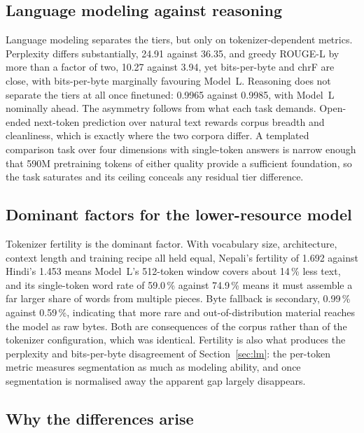 \documentclass[10pt,a4paper]{article}
\newcommand{\pc}[1]{#1\,\%}
\begin{document}
\subsection{Language modeling against reasoning}

Language modeling separates the tiers, but only on tokenizer-dependent
metrics. Perplexity differs substantially, 24.91 against 36.35, and greedy
ROUGE-L by more than a factor of two, 10.27 against 3.94, yet bits-per-byte and
chrF are close, with bits-per-byte marginally favouring Model~L. Reasoning does
not separate the tiers at all once finetuned: 0.9965 against 0.9985, with
Model~L nominally ahead. The asymmetry follows from what each task demands.
Open-ended next-token prediction over natural text rewards corpus breadth and
cleanliness, which is exactly where the two corpora differ. A templated
comparison task over four dimensions with single-token answers is narrow enough
that 590M pretraining tokens of either quality provide a sufficient foundation,
so the task saturates and its ceiling conceals any residual tier difference.

\subsection{Dominant factors for the lower-resource model}

Tokenizer fertility is the dominant factor. With vocabulary size,
architecture, context length and training recipe all held equal, Nepali's
fertility of 1.692 against Hindi's 1.453 means Model~L's \num{512}-token window
covers about \pc{14} less text, and its single-token word rate of \pc{59.0}
against \pc{74.9} means it must assemble a far larger share of words from
multiple pieces. Byte fallback is secondary, \pc{0.99} against \pc{0.59},
indicating that more rare and out-of-distribution material reaches the model as
raw bytes. Both are consequences of the corpus rather than of the tokenizer
configuration, which was identical. Fertility is also what produces the
perplexity and bits-per-byte disagreement of Section~\ref{sec:lm}: the per-token
metric measures segmentation as much as modeling ability, and once segmentation
is normalised away the apparent gap largely disappears.

\subsection{Why the differences arise}
\end{document}
